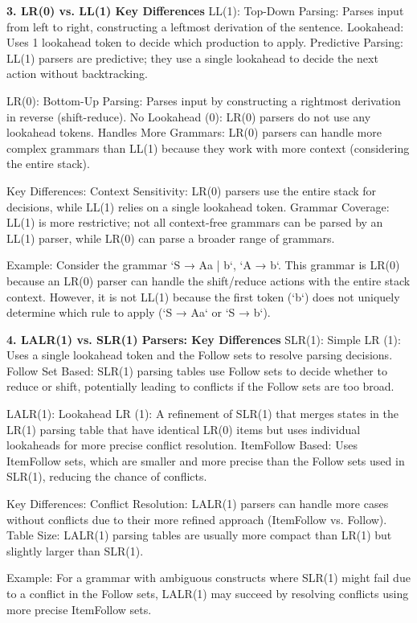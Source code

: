 \textbf{3. LR(0) vs. LL(1) Key Differences}
LL(1):
  Top-Down Parsing: Parses input from left to right, constructing a leftmost derivation of the sentence.
  Lookahead: Uses 1 lookahead token to decide which production to apply.
  Predictive Parsing: LL(1) parsers are predictive; they use a single lookahead to decide the next action without backtracking.

LR(0):
  Bottom-Up Parsing: Parses input by constructing a rightmost derivation in reverse (shift-reduce).
  No Lookahead (0): LR(0) parsers do not use any lookahead tokens.
  Handles More Grammars: LR(0) parsers can handle more complex grammars than LL(1) because they work with more context (considering the entire stack).

Key Differences:
Context Sensitivity: LR(0) parsers use the entire stack for decisions, while LL(1) relies on a single lookahead token.
Grammar Coverage: LL(1) is more restrictive; not all context-free grammars can be parsed by an LL(1) parser, while LR(0) can parse a broader range of grammars.

Example:
Consider the grammar `S → Aa | b`, `A → b`. This grammar is LR(0) because an LR(0) parser can handle the shift/reduce actions with the entire stack context. However, it is not LL(1) because the first token (`b`) does not uniquely determine which rule to apply (`S → Aa` or `S → b`).


\textbf{4. LALR(1) vs. SLR(1) Parsers: Key Differences}
SLR(1):
  Simple LR (1): Uses a single lookahead token and the Follow sets to resolve parsing decisions.
  Follow Set Based: SLR(1) parsing tables use Follow sets to decide whether to reduce or shift, potentially leading to conflicts if the Follow sets are too broad.

LALR(1):
  Lookahead LR (1): A refinement of SLR(1) that merges states in the LR(1) parsing table that have identical LR(0) items but uses individual lookaheads for more precise conflict resolution.
  ItemFollow Based: Uses ItemFollow sets, which are smaller and more precise than the Follow sets used in SLR(1), reducing the chance of conflicts.

Key Differences:
Conflict Resolution: LALR(1) parsers can handle more cases without conflicts due to their more refined approach (ItemFollow vs. Follow).
Table Size: LALR(1) parsing tables are usually more compact than LR(1) but slightly larger than SLR(1).

Example:
For a grammar with ambiguous constructs where SLR(1) might fail due to a conflict in the Follow sets, LALR(1) may succeed by resolving conflicts using more precise ItemFollow sets.


